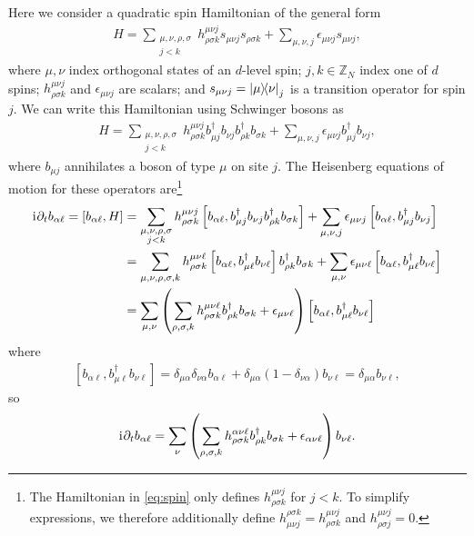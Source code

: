 \documentclass[nofootinbib,notitlepage,11pt]{revtex4-2}
\newcommand{\p}[1]{\left(#1\right)} %
\renewcommand{\sp}[1]{\left[#1\right]} %
\renewcommand{\d}{\partial} %
\renewcommand{\i}{\mathrm{i}\mkern1mu} %
\newcommand{\1}{\mathds{1}}
\newcommand{\ZZ}{\mathbb{Z}}
\begin{document}
Here we consider a quadratic spin Hamiltonian of the general form
\begin{align}
  H = \sum_{\substack{\mu,\nu,\rho,\sigma\\j<k}}
  h^{\mu\nu j}_{\rho\sigma k} s_{\mu\nu j} s_{\rho\sigma k}
  + \sum_{\mu,\nu,j} \epsilon_{\mu\nu j} s_{\mu\nu j},
  \label{eq:spin}
\end{align}
where $\mu,\nu$ index orthogonal states of an $d$-level spin; $j,k\in\ZZ_N$ index one of $d$ spins; $h^{\mu\nu j}_{\rho\sigma k}$ and $\epsilon_{\mu\nu j}$ are scalars; and $s_{\mu\nu j}=\op{\mu}{\nu}_j$ is a transition operator for spin $j$.  We can write this Hamiltonian using Schwinger bosons as
\begin{align}
  H = \sum_{\substack{\mu,\nu,\rho,\sigma\\j<k}}
  h^{\mu\nu j}_{\rho\sigma k}
  b_{\mu j}^\dag b_{\nu j} b_{\rho k}^\dag b_{\sigma k}
  + \sum_{\mu,\nu,j} \epsilon_{\mu\nu j} b_{\mu j}^\dag b_{\nu j},
\end{align}
where $b_{\mu j}$ annihilates a boson of type $\mu$ on site $j$.
The Heisenberg equations of motion for these operators are\footnote{The Hamiltonian in \eqref{eq:spin} only defines $h^{\mu\nu j}_{\rho\sigma k}$ for $j<k$.
  To simplify expressions, we therefore additionally define $h^{\rho\sigma k}_{\mu\nu j}=h^{\mu\nu j}_{\rho\sigma k}$ and $h^{\mu\nu j}_{\rho\sigma j}=0$.}
\begin{align}
  \i \d_t b_{\alpha\ell} = \sp{b_{\alpha\ell}, H}
  &= \sum_{\substack{\mu,\nu,\rho,\sigma\\j<k}}
  h^{\mu\nu j}_{\rho\sigma k}
  \sp{b_{\alpha\ell}, b_{\mu j}^\dag b_{\nu j} b_{\rho k}^\dag b_{\sigma k}}
  + \sum_{\mu,\nu,j} \epsilon_{\mu\nu j}
  \sp{b_{\alpha\ell}, b_{\mu j}^\dag b_{\nu j}} \\
  &= \sum_{\mu,\nu,\rho,\sigma,k} h^{\mu\nu\ell}_{\rho\sigma k}
  \sp{b_{\alpha\ell}, b_{\mu\ell}^\dag b_{\nu\ell}}
  b_{\rho k}^\dag b_{\sigma k}
  + \sum_{\mu,\nu} \epsilon_{\mu\nu\ell}
  \sp{b_{\alpha\ell}, b_{\mu\ell}^\dag b_{\nu\ell}} \\
  &= \sum_{\mu,\nu} \p{\sum_{\rho,\sigma,k}
    h^{\mu\nu\ell}_{\rho\sigma k} b_{\rho k}^\dag b_{\sigma k}
    + \epsilon_{\mu\nu\ell}}
  \sp{b_{\alpha\ell}, b_{\mu\ell}^\dag b_{\nu\ell}}
\end{align}
where
\begin{align}
  \sp{b_{\alpha\ell}, b_{\mu\ell}^\dag b_{\nu\ell}}
  = \delta_{\mu\alpha} \delta_{\nu\alpha} b_{\alpha\ell}
  + \delta_{\mu\alpha} \p{1-\delta_{\nu\alpha}} b_{\nu\ell}
  = \delta_{\mu\alpha} b_{\nu\ell},
\end{align}
so
\begin{align}
  \i \d_t b_{\alpha\ell}
  = \sum_\nu \p{\sum_{\rho,\sigma,k}
    h^{\alpha\nu\ell}_{\rho\sigma k} b_{\rho k}^\dag b_{\sigma k}
    + \epsilon_{\alpha\nu\ell}} b_{\nu\ell}.
\end{align}


\end{document}

